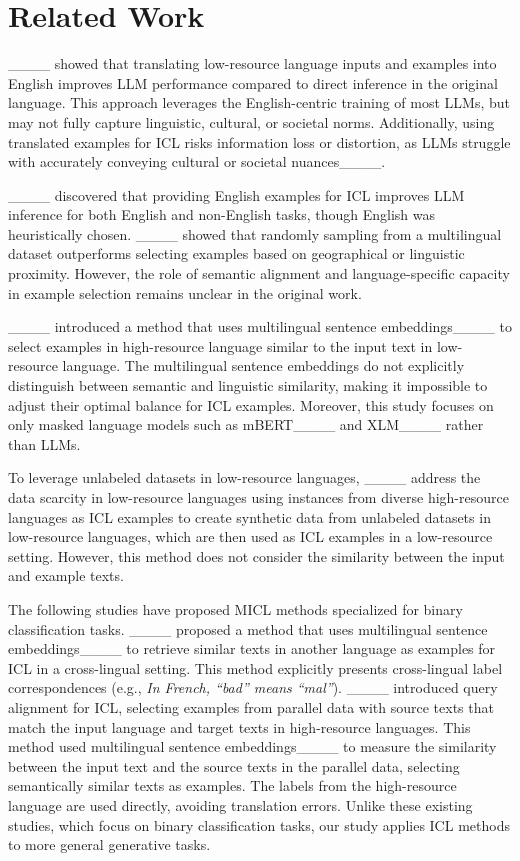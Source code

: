 \section{Related Work}
\label{sec:rel}


____ showed that translating low-resource language inputs and examples into English improves LLM performance compared to direct inference in the original language. This approach leverages the English-centric training of most LLMs, but may not fully capture linguistic, cultural, or societal norms. Additionally, using translated examples for ICL risks information loss or distortion, as LLMs struggle with accurately conveying cultural or societal nuances____.



____ discovered that providing English examples for ICL improves LLM inference for both English and non-English tasks, though English was heuristically chosen. ____ showed that randomly sampling from a multilingual dataset outperforms selecting examples based on geographical or linguistic proximity. However, the role of semantic alignment and language-specific capacity in example selection remains unclear in the original work.


____ introduced a method that uses multilingual sentence embeddings____ to select examples in high-resource language similar to the input text in low-resource language.
The multilingual sentence embeddings do not explicitly distinguish between semantic and linguistic similarity, making it impossible to adjust their optimal balance for ICL examples.
Moreover, this study focuses on only masked language models such as mBERT____ and XLM____ rather than LLMs.





To leverage unlabeled datasets in low-resource languages, ____ address the data scarcity in low-resource languages  using instances from diverse high-resource languages as ICL examples to create synthetic data from unlabeled datasets in low-resource languages, which are then used as ICL examples in a low-resource setting.
However, this method does not consider the similarity between the input and example texts.


The following studies have proposed MICL methods specialized for binary classification tasks.
____ proposed a method that uses multilingual sentence embeddings____ to retrieve similar texts in another language as examples for ICL in a cross-lingual setting.
This method explicitly presents cross-lingual label correspondences (e.g., \textit{In French, ``bad'' means ``mal''}).
____ introduced query alignment for ICL, selecting examples from parallel data with source texts that match the input language and target texts in high-resource languages.
This method used multilingual sentence embeddings____ to measure the similarity between the input text and the source texts in the parallel data, selecting semantically similar texts as examples.
The labels from the high-resource language are used directly, avoiding translation errors.
Unlike these existing studies, which focus on binary classification tasks, our study applies ICL methods to more general generative tasks.

